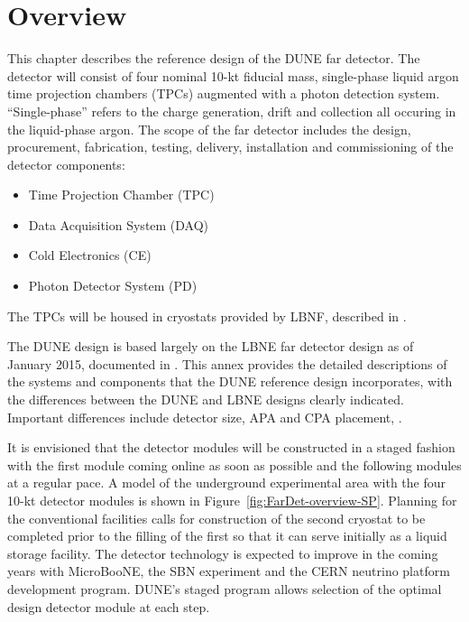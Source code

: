 \section{Overview}
\label{sec:detectors-fd-ref-ov}


This chapter describes the reference design of the DUNE far detector.  The detector will consist of four nominal 10-kt fiducial mass, single-phase liquid argon time projection chambers (TPCs) augmented with a photon detection system.  ``Single-phase'' refers to the charge generation, drift and collection all occuring in the liquid-phase argon. 
%
The scope of the far detector includes the design, procurement, fabrication, testing, delivery, installation and commissioning of the detector components: 

\begin{itemize}
\item Time Projection Chamber (TPC)
\item Data Acquisition System (DAQ)  
\item Cold Electronics (CE)
\item Photon Detector System (PD)
\end{itemize}
The TPCs will be housed in cryostats provided by LBNF, described in \vollbnf.

The DUNE design is based largely on the LBNE far detector design as of January 2015, documented in \anxlbnefd. This annex provides the detailed descriptions of the systems and components that the DUNE reference design incorporates, with the differences between the DUNE and LBNE designs clearly indicated. Important differences include detector size, APA and CPA placement, . 
%

It is envisioned that the detector modules will be constructed in a staged fashion with the first module coming online as soon as possible and the following modules at a regular pace. A model of the underground experimental area with the four 10-kt detector modules is shown in Figure~\ref{fig:FarDet-overview-SP}. Planning for the conventional facilities calls for construction of the second cryostat to be completed prior to the filling of the first so that it can serve initially as a liquid storage facility. 
The detector technology is expected to improve in the coming years with MicroBooNE, the SBN experiment and the CERN neutrino platform development program. DUNE's staged program allows selection of the optimal design detector module at each step. 

